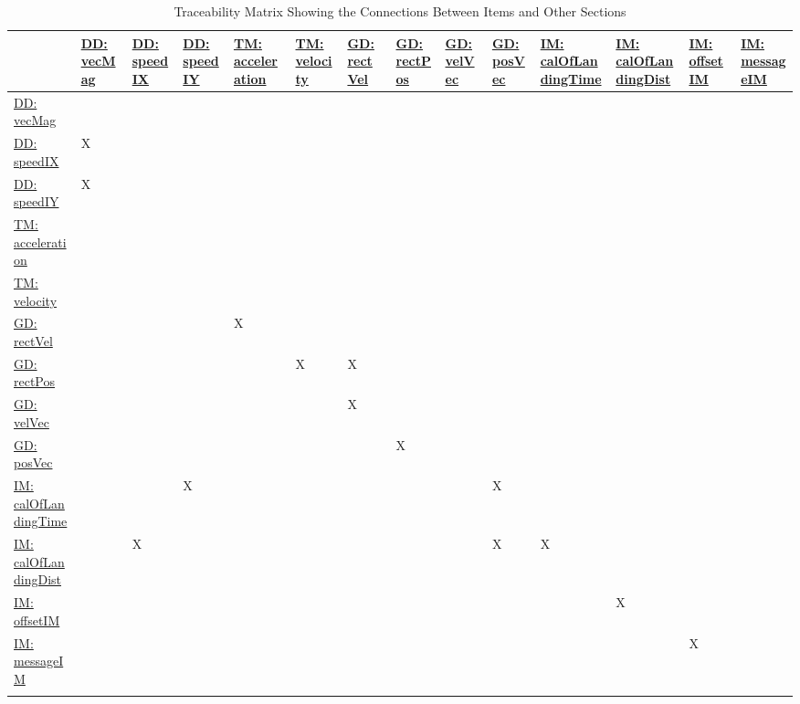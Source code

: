 \documentclass[12pt]{article}
\begin{document}
\begin{longtable}{l l l l l l l l l l l l l l}
\toprule
 & \hyperref[DD:vecMag]{DD: vecMag} & \hyperref[DD:speedIX]{DD: speedIX} & \hyperref[DD:speedIY]{DD: speedIY} & \hyperref[TM:acceleration]{TM: acceleration} & \hyperref[TM:velocity]{TM: velocity} & \hyperref[GD:rectVel]{GD: rectVel} & \hyperref[GD:rectPos]{GD: rectPos} & \hyperref[GD:velVec]{GD: velVec} & \hyperref[GD:posVec]{GD: posVec} & \hyperref[IM:calOfLandingTime]{IM: calOfLandingTime} & \hyperref[IM:calOfLandingDist]{IM: calOfLandingDist} & \hyperref[IM:offsetIM]{IM: offsetIM} & \hyperref[IM:messageIM]{IM: messageIM}
\\
\midrule
\endhead
\hyperref[DD:vecMag]{DD: vecMag} &  &  &  &  &  &  &  &  &  &  &  &  & 
\\
\hyperref[DD:speedIX]{DD: speedIX} & X &  &  &  &  &  &  &  &  &  &  &  & 
\\
\hyperref[DD:speedIY]{DD: speedIY} & X &  &  &  &  &  &  &  &  &  &  &  & 
\\
\hyperref[TM:acceleration]{TM: acceleration} &  &  &  &  &  &  &  &  &  &  &  &  & 
\\
\hyperref[TM:velocity]{TM: velocity} &  &  &  &  &  &  &  &  &  &  &  &  & 
\\
\hyperref[GD:rectVel]{GD: rectVel} &  &  &  & X &  &  &  &  &  &  &  &  & 
\\
\hyperref[GD:rectPos]{GD: rectPos} &  &  &  &  & X & X &  &  &  &  &  &  & 
\\
\hyperref[GD:velVec]{GD: velVec} &  &  &  &  &  & X &  &  &  &  &  &  & 
\\
\hyperref[GD:posVec]{GD: posVec} &  &  &  &  &  &  & X &  &  &  &  &  & 
\\
\hyperref[IM:calOfLandingTime]{IM: calOfLandingTime} &  &  & X &  &  &  &  &  & X &  &  &  & 
\\
\hyperref[IM:calOfLandingDist]{IM: calOfLandingDist} &  & X &  &  &  &  &  &  & X & X &  &  & 
\\
\hyperref[IM:offsetIM]{IM: offsetIM} &  &  &  &  &  &  &  &  &  &  & X &  & 
\\
\hyperref[IM:messageIM]{IM: messageIM} &  &  &  &  &  &  &  &  &  &  &  & X & 
\\
\bottomrule
\caption{Traceability Matrix Showing the Connections Between Items and Other Sections}
\label{Table:TraceMatRefvsRef}
\end{longtable}
\end{document}
